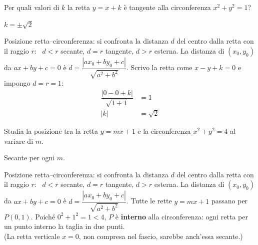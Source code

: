
\begin{question}[ID=3.6, subtitle={Valori di $k$ per cui $y=x+k$ è tangente a $x^2+y^2=1$}, difficulty=media, tags={parametrico, tangente, circonferenza}]
Per quali valori di $k$ la retta $y=x+k$ è tangente alla circonferenza $x^2+y^2=1$?
\begin{solution}
$k=\pm\sqrt2$
\end{solution}
\begin{explanation}
Posizione retta–circonferenza: si confronta la distanza $d$ del centro dalla retta con il raggio $r$: \ $d<r$ secante, $d=r$ tangente, $d>r$ esterna. La distanza di $(x_0,y_0)$ da $ax+by+c=0$ è $d=\dfrac{|ax_0+by_0+c|}{\sqrt{a^2+b^2}}$.
Scrivo la retta come $x-y+k=0$ e impongo $d=r=1$:
\[\begin{aligned}
\dfrac{|0-0+k|}{\sqrt{1+1}} &= 1\\
|k| &= \sqrt2
\end{aligned}\]
\end{explanation}
\end{question}


\begin{question}[ID=3.7, subtitle={Posizione di $y=mx+1$ rispetto a $x^2+y^2=4$ al variare di $m$}, difficulty=facile, tags={parametrico, retta, circonferenza}]
Studia la posizione tra la retta $y=mx+1$ e la circonferenza $x^2+y^2=4$ al variare di $m$.
\begin{solution}
Secante per ogni $m$.
\end{solution}
\begin{explanation}
Posizione retta–circonferenza: si confronta la distanza $d$ del centro dalla retta con il raggio $r$: \ $d<r$ secante, $d=r$ tangente, $d>r$ esterna. La distanza di $(x_0,y_0)$ da $ax+by+c=0$ è $d=\dfrac{|ax_0+by_0+c|}{\sqrt{a^2+b^2}}$.
Tutte le rette $y=mx+1$ passano per $P(0,1)$. Poiché $0^2+1^2=1<4$, $P$ è \textbf{interno} alla circonferenza: ogni retta per un punto interno la taglia in due punti. \\
(La retta verticale $x=0$, non compresa nel fascio, sarebbe anch'essa secante.)
\end{explanation}
\end{question}


